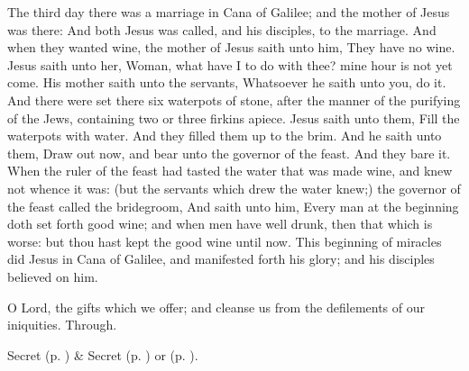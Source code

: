  The third day there was a marriage in Cana of Galilee; and the mother of Jesus was there: And both Jesus was called, and his disciples, to the marriage. And when they wanted wine, the mother of Jesus saith unto him, They have no wine. Jesus saith unto her, Woman, what have I to do with thee? mine hour is not yet come. His mother saith unto the servants, Whatsoever he saith unto you, do it. And there were set there six waterpots of stone, after the manner of the purifying of the Jews, containing two or three firkins apiece. Jesus saith unto them, Fill the waterpots with water. And they filled them up to the brim. And he saith unto them, Draw out now, and bear unto the governor of the feast. And they bare it. When the ruler of the feast had tasted the water that was made wine, and knew not whence it was: (but the servants which drew the water knew;) the governor of the feast called the bridegroom, And saith unto him, Every man at the beginning doth set forth good wine; and when men have well drunk, then that which is worse: but thou hast kept the good wine until now. This beginning of miracles did Jesus in Cana of Galilee, and manifested forth his glory; and his disciples believed on him.


\vspace{-0.25\baselineskip}

\secret\label{EpiphanyIISecret}

\vspace{-0.1\baselineskip}

 O Lord, the gifts which we offer; and cleanse us from the defilements of our iniquities. Through.


\begin{rubric}
     Secret  (p. \pageref{SPMaryPostChristmas}) \&  Secret  (p. \pageref{SPAgainst}) or  (p. \pageref{SPChiefBishop}).
\end{rubric}



